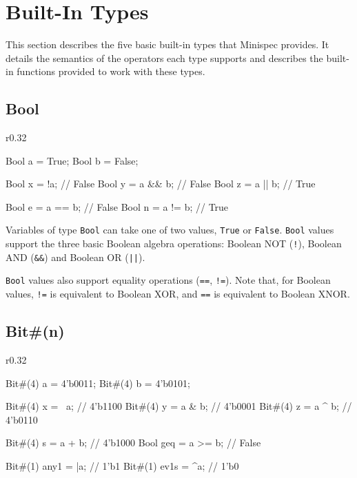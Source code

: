 \section{Built-In Types}
\label{sec:builtin}

This section describes the five basic built-in types that Minispec provides.
It details the semantics of the operators each type supports and describes
the built-in functions provided to work with these types.

\subsection{Bool}
\label{sec:bool}

\begin{wrapfigure}{r}{0.32\columnwidth}
\vspace{-2.5em}
\begin{mscode}
Bool a = True;
Bool b = False;

Bool x = !a;      // False
Bool y = a && b;  // False
Bool z = a || b;  // True

Bool e = a == b;  // False
Bool n = a != b;  // True
\end{mscode}
\vspace{-2em}
\end{wrapfigure}

Variables of type \verb|Bool| can take one of two values, \verb|True| or \verb|False|.
\verb|Bool| values support the three basic Boolean algebra operations:
Boolean NOT (\verb|!|), Boolean AND (\verb|&&|) and Boolean OR (\texttt{||}).

\verb|Bool| values also support equality operations (\verb|==|, \verb|!=|).
Note that, for Boolean values, \verb|!=| is equivalent to Boolean XOR,
and \verb|==| is equivalent to Boolean XNOR.

\subsection{Bit\#(n)}
\label{sec:bit}

\begin{wrapfigure}{r}{0.32\columnwidth}
\vspace{-2.5em}
\begin{mscode}
Bit#(4) a = 4'b0011;
Bit#(4) b = 4'b0101;

Bit#(4) x = ~a;    // 4'b1100
Bit#(4) y = a & b; // 4'b0001
Bit#(4) z = a ^ b; // 4'b0110

Bit#(4) s = a + b; // 4'b1000
Bool geq = a >= b; // False

Bit#(1) any1 = |a; // 1'b1
Bit#(1) ev1s = ^a; // 1'b0
\end{mscode}
\vspace{-2em}
\end{wrapfigure}

